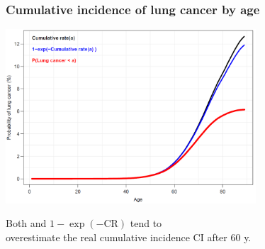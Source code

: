 \documentclass[handout,12pt]{beamer}
\begin{document}

\begin{frame}
\frametitle{Cumulative incidence of lung cancer by age}

\includegraphics[height=6.5cm]{lung-ca-prob}

Both  and $1 - \exp(- \text{CR})$ tend to \\
 overestimate the real cumulative incidence CI after 60 y.
\end{frame}
  

\end{document}
